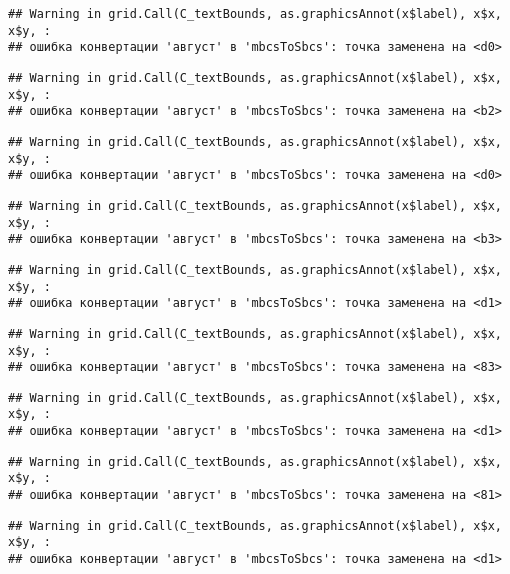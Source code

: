\documentclass[
]{article}
\begin{document}
\begin{verbatim}
## Warning in grid.Call(C_textBounds, as.graphicsAnnot(x$label), x$x, x$y, :
## ошибка конвертации 'август' в 'mbcsToSbcs': точка заменена на <d0>
\end{verbatim}

\begin{verbatim}
## Warning in grid.Call(C_textBounds, as.graphicsAnnot(x$label), x$x, x$y, :
## ошибка конвертации 'август' в 'mbcsToSbcs': точка заменена на <b2>
\end{verbatim}

\begin{verbatim}
## Warning in grid.Call(C_textBounds, as.graphicsAnnot(x$label), x$x, x$y, :
## ошибка конвертации 'август' в 'mbcsToSbcs': точка заменена на <d0>
\end{verbatim}

\begin{verbatim}
## Warning in grid.Call(C_textBounds, as.graphicsAnnot(x$label), x$x, x$y, :
## ошибка конвертации 'август' в 'mbcsToSbcs': точка заменена на <b3>
\end{verbatim}

\begin{verbatim}
## Warning in grid.Call(C_textBounds, as.graphicsAnnot(x$label), x$x, x$y, :
## ошибка конвертации 'август' в 'mbcsToSbcs': точка заменена на <d1>
\end{verbatim}

\begin{verbatim}
## Warning in grid.Call(C_textBounds, as.graphicsAnnot(x$label), x$x, x$y, :
## ошибка конвертации 'август' в 'mbcsToSbcs': точка заменена на <83>
\end{verbatim}

\begin{verbatim}
## Warning in grid.Call(C_textBounds, as.graphicsAnnot(x$label), x$x, x$y, :
## ошибка конвертации 'август' в 'mbcsToSbcs': точка заменена на <d1>
\end{verbatim}

\begin{verbatim}
## Warning in grid.Call(C_textBounds, as.graphicsAnnot(x$label), x$x, x$y, :
## ошибка конвертации 'август' в 'mbcsToSbcs': точка заменена на <81>
\end{verbatim}

\begin{verbatim}
## Warning in grid.Call(C_textBounds, as.graphicsAnnot(x$label), x$x, x$y, :
## ошибка конвертации 'август' в 'mbcsToSbcs': точка заменена на <d1>
\end{verbatim}
\end{document}
